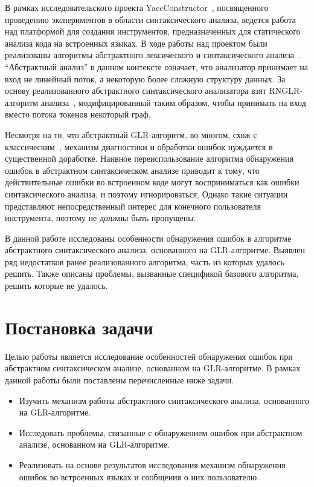 \documentclass{matmex-diploma}
\begin{document}
В рамках исследовательского проекта YaccConstructor~\cite{YaccConstructor}, посвященного проведению 
экспериментов в области синтаксического анализа, ведется работа над платформой 
для создания инструментов, предназначенных для статического анализа кода на встроенных
языках. В ходе работы над проектом были реализованы алгоритмы абстрактного 
лексического и синтаксического анализа~\cite{grigorev2013glr}. “Абстрактный анализ” в данном контексте 
означает, что анализатор принимает на вход не линейный поток, а некоторую более 
сложную структуру данных. За основу реализованного абстрактного синтаксического 
анализатора взят RNGLR-алгоритм анализа~\cite{Scott:2006:RNG:1146809.1146810}, модифицированный таким образом, чтобы 
принимать на вход вместо потока токенов некоторый граф.

Несмотря на то, что абстрактный GLR-алгоритм, во многом, схож с классическим~\cite{grigorev2013glr}, 
механизм диагностики и обработки ошибок нуждается в существенной доработке. 
Наивное переиспользование алгоритма обнаружения ошибок в  абстрактном синтаксическом 
анализе приводит к тому, что действительные ошибки во встроенном коде могут 
восприниматься как ошибки синтаксического анализа, и поэтому игнорироваться. 
Однако такие ситуации представляют непосредственный интерес для конечного пользователя 
инструмента, поэтому не должны быть пропущены. 

В данной работе исследованы особенности обнаружения ошибок в алгоритме абстрактного 
синтаксического анализа, основанного на GLR-алгоритме. Выявлен ряд недостатков 
ранее реализованного алгоритма, часть из которых удалось решить. Также описаны 
проблемы, вызванные спецификой базового алгоритма, решить которые не удалось. 

\section{Постановка задачи}
Целью работы является исследование особенностей обнаружения ошибок при абстрактном
синтаксическом анализе, основанном на GLR-алгоритме.
В рамках данной работы были поставлены перечисленные ниже задачи.
\begin{itemize}
    \item Изучить механизм работы абстрактного синтаксического анализа, основанного 
    на GLR-алгоритме.
    \item Исследовать проблемы, связанные с обнаружением ошибок при абстрактном 
    анализе, основанном на GLR-алгоритме.
    \item Реализовать на основе результатов исследования механизм обнаружения ошибок 
    во встроенных языках и сообщения о них пользователю.
\end{itemize}
\end{document}
